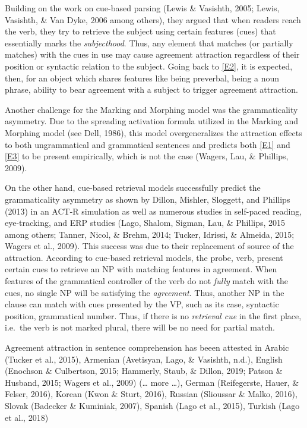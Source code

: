 \documentclass[english,doc]{apa6}
\begin{document}
Building on the work on cue-based parsing (Lewis \& Vasishth, 2005; Lewis, Vasishth, \& Van Dyke, 2006 among others), they argued that when readers reach the verb, they try to retrieve the subject using certain features (cues) that essentially marks the \emph{subjecthood}. Thus, any element that matches (or partially matches) with the cues in use may cause agreement attraction regardless of their position or syntactic relation to the subject. Going back to \autoref{E2}, it is expected, then, for an object which shares features like being preverbal, being a noun phrase, ability to bear agreement with a subject to trigger agreement attraction.

Another challenge for the Marking and Morphing model was the grammaticality asymmetry. Due to the spreading activation formula
utilized in the Marking and Morphing model (see Dell, 1986), this model overgeneralizes the attraction effects to both ungrammatical and grammatical sentences and predicts both \autoref{E1} and \autoref{E3} to be present empirically, which is not the case (Wagers, Lau, \& Phillips, 2009).

\begin{exe}
\label{E3}
\end{exe}

On the other hand, cue-based retrieval models successfully predict the grammaticality asymmetry as shown by Dillon, Mishler, Sloggett, and Phillips (2013) in an ACT-R simulation as well as numerous studies in self-paced reading, eye-tracking, and ERP studies (Lago, Shalom, Sigman, Lau, \& Phillips, 2015 among others; Tanner, Nicol, \& Brehm, 2014; Tucker, Idrissi, \& Almeida, 2015; Wagers et al., 2009). This success was due to their replacement of source of the attraction. According to cue-based retrieval models, the probe, verb, present certain cues to retrieve an NP with matching features in agreement. When features of the grammatical controller of the verb do not \emph{fully} match with the cues, no single NP will be satisfying the \emph{agreement}. Thus, another NP in the clause can match with cues presented by the VP, such as its case, syntactic position, grammatical number. Thus, if there is no \emph{retrieval cue} in the first place, i.e.~the verb is not marked plural, there will be no need for partial match.

Agreement attraction in sentence comprehension has beeen attested in
Arabic (Tucker et al., 2015),
Armenian (Avetisyan, Lago, \& Vasishth, n.d.),
English (Enochson \& Culbertson, 2015; Hammerly, Staub, \& Dillon, 2019; Patson \& Husband, 2015; Wagers et al., 2009) (\ldots{} more \ldots{}),
German (Reifegerste, Hauer, \& Felser, 2016),
Korean (Kwon \& Sturt, 2016),
Russian (Slioussar \& Malko, 2016),
Slovak (Badecker \& Kuminiak, 2007),
Spanish (Lago et al., 2015),
Turkish (Lago et al., 2018)
\end{document}
